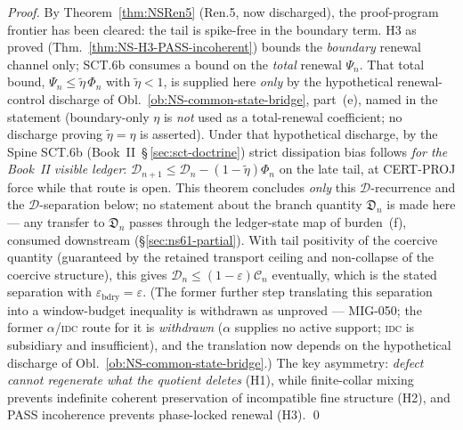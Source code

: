 \documentclass[12pt,oneside]{amsbook}
\theoremstyle{plain}
\theoremstyle{definition}
\theoremstyle{remark}
\begin{document}
\begin{proof}
By Theorem~\ref{thm:NSRen5} (Ren.5, now discharged), the
proof-program frontier has been cleared: the tail is spike-free
in the boundary term. H3 as proved
(Thm.~\ref{thm:NS-H3-PASS-incoherent}) bounds the \emph{boundary}
renewal channel only; SCT.6b consumes a bound on the \emph{total}
renewal $\Psi_n$. That total bound,
$\Psi_n \leq \widetilde\eta\,\Phi_n$ with
$\widetilde\eta < 1$, is supplied here \emph{only} by the
hypothetical renewal-control discharge of
Obl.~\ref{ob:NS-common-state-bridge}, part~(e), named in the
statement (boundary-only $\eta$ is \emph{not} used as a
total-renewal coefficient; no discharge proving
$\widetilde\eta = \eta$ is asserted). Under that hypothetical
discharge, by the Spine SCT.6b
(Book~II~\S\,\ref{sec:sct-doctrine}) strict dissipation bias
follows \emph{for the Book~II visible ledger}: 
$\mathcal{D}_{n+1} \leq \mathcal{D}_n -
(1-\widetilde\eta)\Phi_n$ on the late tail, at CERT-PROJ force
while that route is open. This theorem concludes \emph{only} this
$\mathcal{D}$-recurrence and the $\mathcal{D}$-separation below;
no statement about the branch quantity $\mathfrak{D}_n$ is made
here --- any transfer to $\mathfrak{D}_n$ passes through the
ledger-state map of burden~(f), consumed downstream
(\S\ref{sec:ns61-partial}). With tail positivity of the
coercive quantity (guaranteed by the retained transport ceiling
and non-collapse of the coercive structure), this gives
$\mathcal{D}_n \leq (1-\varepsilon)\mathcal{C}_n$ eventually,
which is the stated separation with
$\varepsilon_{\mathrm{bdry}} = \varepsilon$. (The former further
step translating this separation into a window-budget inequality is
withdrawn as unproved --- MIG-050; the former $\alpha$/\textsc{idc}
route for it is \emph{withdrawn} ($\alpha$ supplies no active
support; \textsc{idc} is subsidiary and insufficient), and the
translation now depends on the hypothetical discharge of
Obl.~\ref{ob:NS-common-state-bridge}.) The key asymmetry:
\emph{defect cannot regenerate what the quotient deletes}
(H1), while finite-collar mixing prevents indefinite coherent
preservation of incompatible fine structure (H2), and PASS
incoherence prevents phase-locked renewal (H3). \qed
\end{proof}
\end{document}

